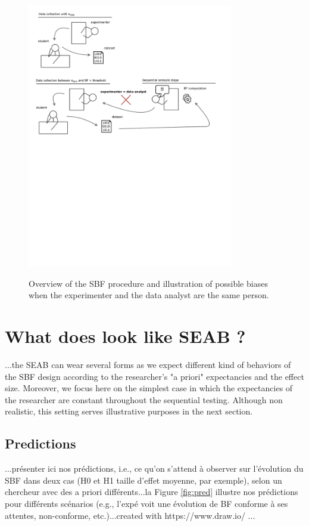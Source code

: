 \documentclass[a4paper,man,natbib,floatsintext,donotrepeattitle]{apa6}
\begin{document}
\begin{figure}[H]
  \caption{Overview of the SBF procedure and illustration of possible biases when the experimenter and the data analyst are the same person.}
  \centering
  \includegraphics[width=0.8\textwidth]{figures/bias_diag.pdf}
  \label{fig:diag1}
\end{figure}

\section{What does look like SEAB ?}

...the SEAB can wear several forms as we expect different kind of behaviors of the SBF design according to the researcher's "a priori" expectancies and the effect size. Moreover, we focus here on the simplest case in which the expectancies of the researcher are constant throughout the sequential testing. Although non realistic, this setting serves illustrative purposes in the next section.

\subsection{Predictions}

...présenter ici nos prédictions, i.e., ce qu'on s'attend à observer sur l'évolution du SBF dans deux cas (H0 et H1 taille d'effet moyenne, par exemple), selon un chercheur avec des a priori différents...la Figure \ref{fig:pred} illustre nos prédictions pour différents scénarios (e.g., l'expé voit une évolution de BF conforme à ses attentes, non-conforme, etc.)...created with https://www.draw.io/ ...
\end{document}
